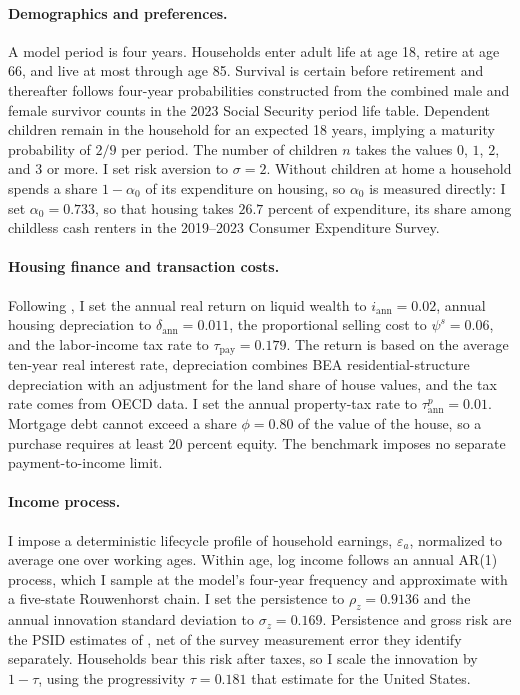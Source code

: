 \documentclass[11pt]{article}
\begin{document}
\paragraph{Demographics and preferences.}
A model period is four years. Households enter adult life at age 18, retire at
age 66, and live at most through age 85. Survival is certain before retirement
and thereafter follows four-year probabilities constructed from the combined
male and female survivor counts in the 2023 Social Security period life table.
Dependent children remain in the household for an expected 18 years, implying
a maturity probability of $2/9$ per period. The number of children $n$ takes the values
$0$, $1$, $2$, and $3$ or more. I set risk aversion to $\sigma=2$. Without
children at home a household spends a share $1-\alpha_0$ of its expenditure
on housing, so $\alpha_0$ is measured directly: I set $\alpha_0=0.733$, so
that housing takes $26.7$ percent of expenditure, its share among childless
cash renters in the 2019--2023 Consumer Expenditure Survey.

\paragraph{Housing finance and transaction costs.}
Following \citet{greaneyDynamicUrbanEconomics2025}, I set the annual real
return on liquid wealth to $i_{\mathrm{ann}}=0.02$, annual housing depreciation
to $\delta_{\mathrm{ann}}=0.011$, the proportional selling cost to
$\psi^s=0.06$, and the labor-income tax rate to
$\tau_{\mathrm{pay}}=0.179$. The return is based on the average ten-year real
interest rate, depreciation combines BEA residential-structure depreciation
with an adjustment for the land share of house values, and the tax rate comes
from OECD data. I set the annual property-tax rate to
$\tau^p_{\mathrm{ann}}=0.01$. Mortgage debt cannot exceed a share $\phi=0.80$
of the value of the house, so a purchase requires at least 20 percent equity.
The benchmark imposes no separate payment-to-income limit.

\paragraph{Income process.}
I impose a deterministic lifecycle profile of household earnings,
$\varepsilon_a$, normalized to average one over working ages. Within age, log income follows an
annual AR(1) process, which I sample at the model's four-year frequency and
approximate with a five-state Rouwenhorst chain. I set the persistence to
$\rho_z=0.9136$ and the annual innovation standard deviation to
$\sigma_z=0.169$. Persistence and gross risk are the PSID estimates of
\citet{flodenLinde2001}, net of the survey measurement error they identify
separately. Households bear this risk after taxes, so I scale the innovation
by $1-\tau$, using the progressivity $\tau=0.181$ that
\citet{heathcoteStoreslettenViolante2017} estimate for the United States.
\end{document}
